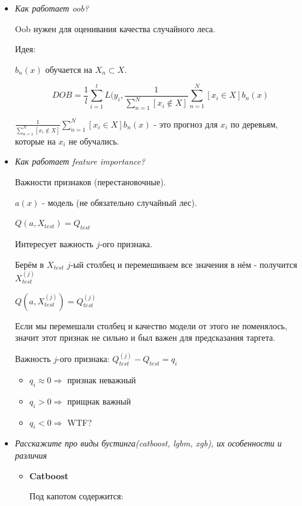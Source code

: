 \documentclass[a4paper]{article}
\begin{document}
\begin{itemize}
\item \textit{Как работает oob?}

Oob нужен для оценивания качества случайного леса.

Идея:

$b_n(x)$ обучается на $X_n \subset X$.

\[ DOB = \frac{1}{l} \sum_{i=1}^l L(y_i, \frac{1}{\sum_{n=1}^N [x_i \not\in X]} \sum_{n=1}^N [x_i \in X] b_n(x) \]

$\frac{1}{\sum_{n=1}^N [x_i \not\in X]} \sum_{n=1}^N [x_i \in X] b_n(x)$ - это прогноз для $x_i$ по деревьям, которые на $x_i$ не обучались.

\item \textit{Как работает feature importance?}

Важности признаков (перестановочные).

$a(x)$ - модель (не обязательно случайный лес).

$Q(a, X_{test}) = Q_{test}$

Интересует важность $j$-ого признака.

Берём в $X_{test}$ $j$-ый столбец и перемешиваем все значения в нём - получится $X_{test}^{(j)}$

$Q(a, X_{test}^{(j)}) = Q_{test}^{(j)}$

Если мы перемешали столбец и качество модели от этого не поменялось, значит этот признак не сильно и был важен для предсказания таргета.

Важность $j$-ого признака: $Q_{test}^{(j)} - Q_{test} = q_i$

\begin{itemize}

\item $q_i \approx 0 \Rightarrow$ признак неважный

\item $q_i > 0 \Rightarrow$ прищнак важный

\item $q_i < 0 \Rightarrow $ WTF?
\end{itemize}

\item \textit{Расскажите про виды бустинга(catboost, lgbm, xgb), их особенности и различия}

\begin{itemize}

\item \textbf{Catboost}

Под капотом содержится:
\begin{itemize}


\end{itemize}
\end{itemize}
\end{itemize}
\end{document}

